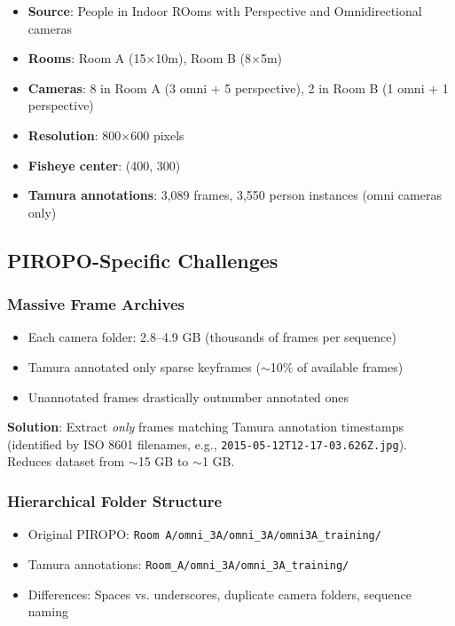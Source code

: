 \documentclass[11pt]{article}
\begin{document}
\begin{itemize}[leftmargin=*]
    \item \textbf{Source}: People in Indoor ROoms with Perspective and Omnidirectional cameras
    \item \textbf{Rooms}: Room A (15$\times$10m), Room B (8$\times$5m)
    \item \textbf{Cameras}: 8 in Room A (3 omni + 5 perspective), 2 in Room B (1 omni + 1 perspective)
    \item \textbf{Resolution}: 800$\times$600 pixels
    \item \textbf{Fisheye center}: (400, 300)
    \item \textbf{Tamura annotations}: 3,089 frames, 3,550 person instances (omni cameras only)
\end{itemize}

\subsection{PIROPO-Specific Challenges}

\subsubsection{Massive Frame Archives}

\begin{itemize}[leftmargin=*]
    \item Each camera folder: 2.8--4.9 GB (thousands of frames per sequence)
    \item Tamura annotated only sparse keyframes ($\sim$10\% of available frames)
    \item Unannotated frames drastically outnumber annotated ones
\end{itemize}

\textbf{Solution}: Extract \textit{only} frames matching Tamura annotation timestamps (identified by ISO 8601 filenames, e.g., \texttt{2015-05-12T12-17-03.626Z.jpg}). Reduces dataset from $\sim$15 GB to $\sim$1 GB.

\subsubsection{Hierarchical Folder Structure}

\begin{itemize}[leftmargin=*]
    \item Original PIROPO: \texttt{Room A/omni\_3A/omni\_3A/omni3A\_training/}
    \item Tamura annotations: \texttt{Room\_A/omni\_3A/omni\_3A\_training/}
    \item Differences: Spaces vs. underscores, duplicate camera folders, sequence naming
\end{itemize}
\end{document}
